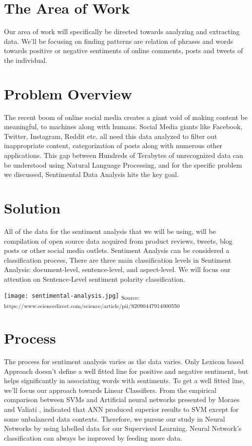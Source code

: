 \section{The Area of Work}
Our area of work will specifically be directed towards analyzing and extracting data. We'll be focusing on finding patterns are relation of phrases and words towards positive or negative sentiments of online comments, posts and tweets of the individual.
 

\section{Problem Overview}
The recent boom of online social media creates a giant void of making content be meaningful, to machines along with humans. Social Media giants like Facebook, Twitter, Instagram, Reddit etc. all need this data analyzed to filter out inappropriate content, categorization of posts along with numerous other applications. 
This gap between Hundreds of Terabytes of unrecognized data can be understood using Natural Language Processing, and for the specific problem we discussed, Sentimental Data Analysis hits the key goal.

\section{Solution}
All of the data for the sentiment analysis that we will be using, will be compilation of open source data acquired from product reviews, tweets, blog posts or other social media outlets. Sentiment Analysis can be considered a classification process, There are three main classification levels in Sentiment Analysis: document-level, sentence-level, and aspect-level. We will focus our attention on Sentence-Level sentiment polarity classification.\newline

\texttt{[image: sentimental-analysis.jpg]}\newline
\textsubscript{Source: https://www.sciencedirect.com/science/article/pii/S2090447914000550}


\section{Process}
The process for sentiment analysis varies as the data varies. Only Lexicon based Approach doesn't define a well fitted line for positive and negative sentiment, but helps significantly in associating words with sentiments. To get a well fitted line, we'll focus our approach towards Linear Classifiers. From the empirical comparison between SVMs and Artificial neural networks presented by Moraes and Valiati \cite{moraes2013document}, indicated that ANN produced superior results to SVM except for some unbalanced data contexts. Therefore, we pursue our study in Neural Networks by using labelled data for our Supervised Learning. Neural Network's classification can always be improved by feeding more data.\newline


